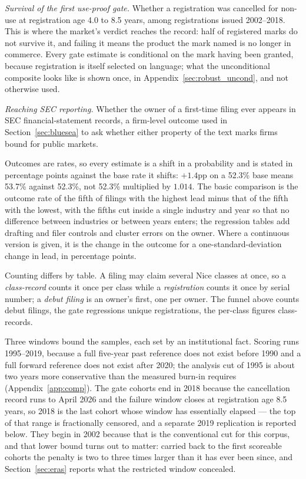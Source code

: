 \emph{Survival of the first use-proof gate.} Whether a registration was
cancelled for non-use at registration age 4.0 to 8.5 years, among
registrations issued 2002--2018. This is where the market's verdict reaches
the record: half of registered marks do not survive it, and failing it means
the product the mark named is no longer in commerce. Every gate estimate is
conditional on the mark having been granted, because registration is itself
selected on language; what the unconditional composite looks like is shown
once, in Appendix~\ref{sec:robust_uncond}, and not otherwise used.

\emph{Reaching SEC reporting.} Whether the owner of a first-time filing ever
appears in SEC financial-statement records, a firm-level outcome used in
Section~\ref{sec:bluesea} to ask whether either property of the text marks
firms bound for public markets.

Outcomes are rates, so every estimate is a shift in a probability and is
stated in percentage points against the base rate it shifts: $+1.4$pp on a
52.3\% base means 53.7\% against 52.3\%, not 52.3\% multiplied by $1.014$.
The basic comparison is the outcome rate of the fifth of filings with the
highest lead minus that of the fifth with the lowest, with the fifths cut
inside a single industry and year so that no difference between industries or
between years enters; the regression tables add drafting and filer controls
and cluster errors on the owner. Where a continuous version is given, it is
the change in the outcome for a one-standard-deviation change in lead, in
percentage points.

Counting differs by table. A filing may claim several Nice classes at once, so
a \emph{class-record} counts it once per class while a \emph{registration}
counts it once by serial number; a \emph{debut filing} is an owner's first, one
per owner. The funnel above counts debut filings, the gate regressions unique
registrations, the per-class figures class-records.

Three windows bound the samples, each set by an institutional fact. Scoring
runs 1995--2019, because a full
five-year past reference does not exist before 1990 and a full forward
reference does not exist after 2020; the analysis cut of 1995 is about two
years more conservative than the measured burn-in requires
(Appendix~\ref{app:comp}). The gate cohorts end in 2018 because the
cancellation record runs to April 2026 and the failure window closes at
registration age 8.5 years, so 2018 is the last cohort whose window has
essentially elapsed --- the top of that range is fractionally censored, and
a separate 2019 replication is reported below. They begin in 2002 because
that is the conventional cut for this corpus, and that lower
bound turns out to matter: carried back to the first scoreable cohorts the
penalty is two to three times larger than it has ever been since, and
Section~\ref{sec:eras} reports what the restricted window concealed.

